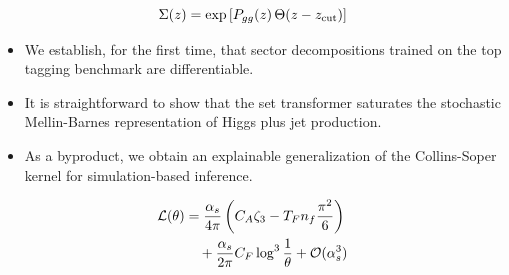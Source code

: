 \begin{equation}
  \Sigma(z) = \exp\left[P_{gg}(z) \, \Theta(z - z_{\rm cut})\right]
  \label{eq:1}
\end{equation}

\begin{itemize}
  \item We establish, for the first time, that sector decompositions trained on the top tagging benchmark are differentiable.
  \item It is straightforward to show that the set transformer saturates the stochastic Mellin-Barnes representation of Higgs plus jet production.
  \item As a byproduct, we obtain an explainable generalization of the Collins-Soper kernel for simulation-based inference.
\end{itemize}

\begin{align}
  \mathcal{L}(\theta) &= \frac{\alpha_s}{4\pi} \left( C_A \zeta_{3} - T_F n_f \frac{\pi^2}{6} \right) \nonumber \\
  &\quad + \frac{\alpha_s}{2\pi} C_F \log^{3} \frac{1}{\theta} + \mathcal{O}(\alpha_s^3) \label{eq:2}
\end{align}

